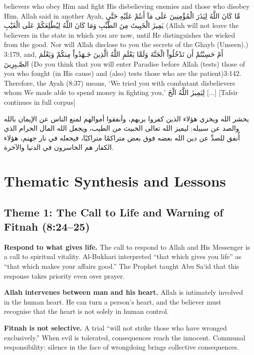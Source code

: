 \documentclass[11pt,a4paper,openany]{book}
\let\textAR\textarabic
\begin{document}
\begin{tafsirbox}
believers who obey Him and fight His disbelieving enemies and those who disobey Him. Allah said in another Ayah, \textAR{مَّا} \textAR{كَانَ} \textAR{اللَّهُ} \textAR{لِيَذَرَ} \textAR{الْمُؤْمِنِينَ} \textAR{عَلَى} \textAR{مَآ} \textAR{أَنتُمْ} \textAR{عَلَيْهِ} \textAR{حَتَّى} \textAR{يَمِيزَ} \textAR{الْخَبِيثَ} \textAR{مِنَ} \textAR{الطَّيِّبِ} \textAR{وَمَا} \textAR{كَانَ} \textAR{اللَّهُ} \textAR{لِيُطْلِعَكُمْ} \textAR{عَلَى} \textAR{الْغَيْبِ} (Allah will not leave the believers in the state in which you are now, until He distinguishes the wicked from the good. Nor will Allah disclose to you the secrets of the Ghayb (Unseen).) 3:179, and, \textAR{أَمْ} \textAR{حَسِبْتُمْ} \textAR{أَن} \textAR{تَدْخُلُواْ} \textAR{الْجَنَّةَ} \textAR{وَلَمَّا} \textAR{يَعْلَمِ} \textAR{اللَّهُ} \textAR{الَّذِينَ} \textAR{جَـهَدُواْ} \textAR{مِنكُمْ} \textAR{وَيَعْلَمَ} \textAR{الصَّـبِرِينَ} (Do you think that you will enter Paradise before Allah (tests) those of you who fought (in His cause) and (also) tests those who are the patient)3:142. Therefore, the Ayah (8:37) means, `We tried you with combatant disbelievers whom We made able to spend money in fighting you,' \textAR{لِيَمِيزَ} \textAR{اللَّهُ} \textAR{الْخَ} [...] [Tafsir continues in full corpus]
\end{tafsirbox}


\begin{muyassarbox}
\textAR{يحشر الله ويخزي هؤلاء الذين كفروا بربهم، وأنفقوا أموالهم لمنع الناس عن الإيمان بالله والصد عن سبيله; ليميز الله تعالى الخبيث من الطيب، ويجعل الله المال الحرام الذي أُنفق للصدِّ عن دين الله بعضه فوق بعض متراكمًا متراكبًا، فيجعله في نار جهنم، هؤلاء الكفار هم الخاسرون في الدنيا والآخرة.}
\end{muyassarbox}


\chapter{Thematic Synthesis and Lessons}

\section{Theme 1: The Call to Life and Warning of Fitnah (8:24--25)}
\begin{themebox}
\textbf{Respond to what gives life.} The call to respond to Allah and His Messenger is a call to spiritual vitality. Al-Bukhari interpreted ``that which gives you life'' as ``that which makes your affairs good.'' The Prophet taught Abu Sa`id that this response takes priority even over prayer.

\textbf{Allah intervenes between man and his heart.} Allah is intimately involved in the human heart. He can turn a person's heart, and the believer must recognise that the heart is not solely in human control.

\textbf{Fitnah is not selective.} A trial ``will not strike those who have wronged exclusively.'' When evil is tolerated, consequences reach the innocent. Communal responsibility: silence in the face of wrongdoing brings collective consequences.
\end{themebox}
\end{document}
